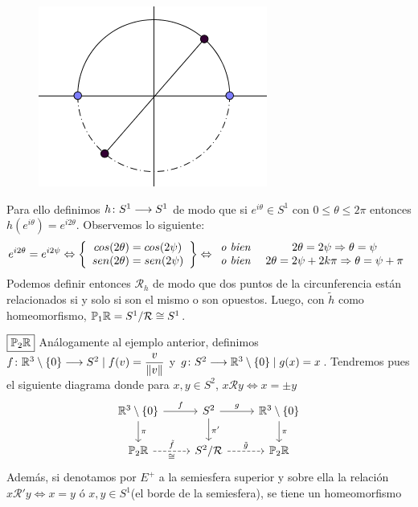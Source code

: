\documentclass[GTS.tex]{subfiles}
\begin{document}
\begin{ej}
\begin{figure}[h]
	\centering
	\includegraphics[scale=0.4]{s1}
\end{figure}

Para ello definimos $h\colon{S^1}\longrightarrow{S^1}$ de modo que si $e^{i\theta}\in S^1$ con $0\leq\theta\leq 2\pi$ entonces $h(e^{i\theta})=e^{i2\theta}$. Observemos lo siguiente:
\begin{gather*}
e^{i2\theta}=e^{i2\psi}\Leftrightarrow\left\{\begin{array}{c}
cos(2\theta)=cos(2\psi)\\
sen(2\theta)=sen(2\psi)
\end{array}\right\}\Leftrightarrow\begin{array}{c c}
\textit{o bien } & 2\theta=2\psi\Rightarrow\theta=\psi\\
\textit{o bien } & 2\theta=2\psi+2k\pi\Rightarrow\theta=\psi+\pi
\end{array}
\end{gather*}
Podemos definir entonces $\mathcal{R}_h$ de modo que dos puntos de la circunferencia están relacionados si y solo si son el mismo o son opuestos. Luego, con $\tilde{h}$ como homeomorfismo, $\mathbb{P}_1\mathbb{R}=S^1/\mathcal{R}\cong S^1$.\\
\item[$\boxed{\mathbb{P}_2\mathbb{R}}$] Análogamente al ejemplo anterior, definimos $f\colon{\mathbb{R}^3\setminus\{0\}}\longrightarrow{S^2}\mid f(v)=\dfrac{v}{\lVert v\rVert}$ y $g\colon{S^2}\longrightarrow{\mathbb{R}^3\setminus\{0\}}\mid g(x)=x$. Tendremos pues el siguiente diagrama donde para $x,y \in S^2$, $x\mathcal{R}y\Leftrightarrow x=\pm y$
\[
\begin{tikzcd}
\R^3\setminus\{0\} \ar[r, "f"]\arrow[d,"\pi "] & S^2 \arrow[r,"g"]\arrow[d,"\pi' "] & \R^3\setminus\{0\}\arrow[d,"\pi "]\\
\Pro_2\R \arrow[r, dashrightarrow, "\tilde{f} ","\cong"'] & S^2/\mathcal{R}\arrow[r, dashrightarrow, "\tilde{g} "] & \Pro_2\R
\end{tikzcd}
\]
Además, si denotamos por $E^+$ a la semiesfera superior y sobre ella la relación $x\mathcal{R}'y\Leftrightarrow x=y$ ó $x,y\in S^1$(el borde de la semiesfera), se tiene un homeomorfismo


\end{ej}
\end{document}

